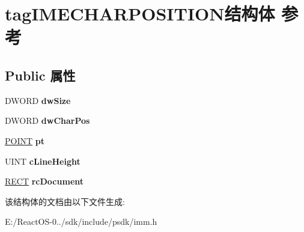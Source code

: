 \hypertarget{structtag_i_m_e_c_h_a_r_p_o_s_i_t_i_o_n}{}\section{tag\+I\+M\+E\+C\+H\+A\+R\+P\+O\+S\+I\+T\+I\+O\+N结构体 参考}
\label{structtag_i_m_e_c_h_a_r_p_o_s_i_t_i_o_n}
\subsection*{Public 属性}
\begin{DoxyCompactItemize}
\item 
\mbox{\label{structtag_i_m_e_c_h_a_r_p_o_s_i_t_i_o_n_a10dc4d973a87102fc2163a71b96069a2}} 
D\+W\+O\+RD {\bfseries dw\+Size}
\item 
\mbox{\label{structtag_i_m_e_c_h_a_r_p_o_s_i_t_i_o_n_ab2fccafa9b98f637c2274bb40f73054c}} 
D\+W\+O\+RD {\bfseries dw\+Char\+Pos}
\item 
\mbox{\label{structtag_i_m_e_c_h_a_r_p_o_s_i_t_i_o_n_acc329a5f478ef57f71e8c62df0d2514f}} 
\hyperlink{structtag_p_o_i_n_t}{P\+O\+I\+NT} {\bfseries pt}
\item 
\mbox{\label{structtag_i_m_e_c_h_a_r_p_o_s_i_t_i_o_n_af9f1de60b5910370c6e2db666695ad15}} 
U\+I\+NT {\bfseries c\+Line\+Height}
\item 
\mbox{\label{structtag_i_m_e_c_h_a_r_p_o_s_i_t_i_o_n_aa7463011ed104e5cfc569db09398739b}} 
\hyperlink{structtag_r_e_c_t}{R\+E\+CT} {\bfseries rc\+Document}
\end{DoxyCompactItemize}


该结构体的文档由以下文件生成\+:\begin{DoxyCompactItemize}
\item 
E\+:/\+React\+O\+S-\/0../sdk/include/psdk/imm.\+h\end{DoxyCompactItemize}

